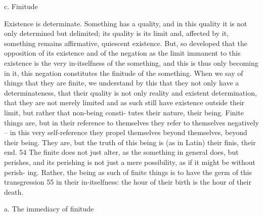c. Finitude

Existence is determinate. Something has a quality, and in this quality it is
not only determined but delimited; its quality is its limit and, affected by it,
something remains affirmative, quiescent existence. But, so developed that
the opposition of its existence and of the negation as the limit immanent to
this existence is the very in-itselfness of the something, and this is thus only
becoming in it, this negation constitutes the finitude of the something.
When we say of things that they are finite, we understand by this that
they not only have a determinateness, that their quality is not only reality
and existent determination, that they are not merely limited and as such
still have existence outside their limit, but rather that non-being consti-
tutes their nature, their being. Finite things are, but in their reference to
themselves they refer to themselves negatively – in this very self-reference
they propel themselves beyond themselves, beyond their being. They are,
but the truth of this being is (as in Latin) their finis, their end. 54 The finite
does not just alter, as the something in general does, but perishes, and its
perishing is not just a mere possibility, as if it might be without perish-
ing. Rather, the being as such of finite things is to have the germ of this
transgression 55 in their in-itselfness: the hour of their birth is the hour of
their death.

a. The immediacy of finitude

